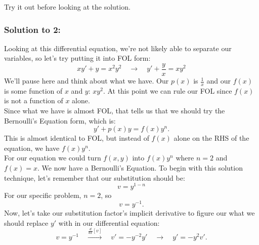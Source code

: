\documentclass[a4paper,12pt]{article}
\begin{document}
Try it out before looking at the solution.
\pagebreak

\subsubsection*{Solution to 2:}
Looking at this differential equation, we're not likely able to separate our variables, so let's try putting it into FOL form:
$$ xy' + y = x^2y^2 \quad\rightarrow \quad y' + \frac{y}{x} = xy^2$$
We'll pause here and think about what we have. Our $p(x)$ is $\frac{1}{x}$ and our $f(x)$ is some function of $x$ and $y$: $xy^2$. At this point we can rule our FOL since $f(x)$ is not a function of $x$ alone.\\

Since what we have is almost FOL, that tells us that we should try the Bernoulli's Equation form, which is:
$$ y' + p(x)y = f(x)y^n. $$
This is almost identical to FOL, but instead of $f(x)$ alone on the RHS of the equation, we have $f(x)y^n$.\\

For our equation we could turn $f(x,y)$ into $f(x)y^n$ where $n=2$ and $f(x)=x$. We now have
a Bernoulli's Equation. To begin with this solution technique, let's remember that our substitution should be:
$$ \boxed{v = y^{1-n}} $$
For our specific problem, $n=2$, so
$$ v = y^{-1}.$$
Now, let's take our substitution factor's implicit derivative to figure our what we should replace $y'$ with in our differential equation:
$$ v = y^{-1} \quad\overset{\frac{d}{dx}[v]}\rightarrow \quad v' = -y^{-2}y' \quad\rightarrow \quad y' = -y^2v'.$$
\end{document}
